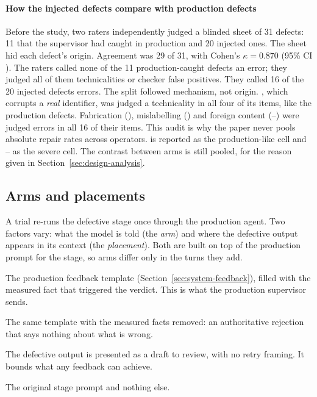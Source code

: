 \paragraph{How the injected defects compare with production defects}
Before the study, two raters independently judged a blinded sheet of 31
defects: 11 that the supervisor had caught in production and 20 injected
ones. The sheet hid each defect's origin. Agreement was 29 of 31, with Cohen's
$\kappa = 0.870$ (95\% CI ). The raters called none of the 11
production-caught defects an error; they judged all of them technicalities
or checker false positives. They called 16 of the 20 injected defects errors.
The split followed mechanism, not origin. , which corrupts a
\emph{real} identifier, was judged a technicality in all four of its items,
like the production defects. Fabrication (), mislabelling () and
foreign content (--) were judged errors in all 16 of their items.
This audit is why the paper never pools absolute repair rates across
operators.  is reported as the production-like cell and
-- as the severe cell. The contrast between arms is still pooled,
for the reason given in Section~\ref{sec:design-analysis}.

\subsection{Arms and placements}
\label{sec:design-arms}

A trial re-runs the defective stage once through the production agent. Two
factors vary: what the model is told (the \emph{arm}) and where the defective
output appears in its context (the \emph{placement}). Both are built on top of
the production prompt for the stage, so arms differ only in the turns they add.

\begin{description}[leftmargin=1.2em,style=nextline]
\item[\arm{A1}, measured-fact feedback.] The production feedback template
  (Section~\ref{sec:system-feedback}), filled with the measured fact that
  triggered the verdict. This is what the production supervisor sends.
\item[\arm{A2}, contentless rejection.] The same template with the measured
  facts removed: an authoritative rejection that says nothing about what is
  wrong.
\item[\arm{A0}, capability ceiling.] The defective output is presented as a
  draft to review, with no retry framing. It bounds what any feedback can
  achieve.
\item[\arm{A3}, regeneration baseline.] The original stage prompt and nothing
  else.
\end{description}


